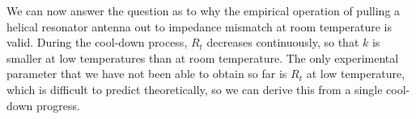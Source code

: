 We can now answer the question as to why the empirical operation of pulling a helical resonator antenna out to impedance mismatch at room temperature is valid. During the cool-down process, $R_t$ decreases continuously, so that $k$ is smaller at low temperatures than at room temperature. The only experimental parameter that we have not been able to obtain so far is $R_t$ at low temperature, which is difficult to predict theoretically, so we can derive this from a single cool-down progress.